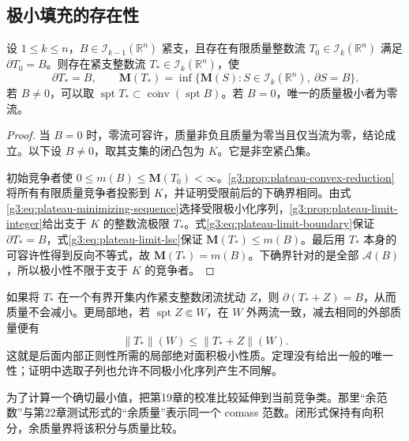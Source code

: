 \subsection{极小填充的存在性}
\label{g3:subsec:2302:04}
\begin{theorem}\label{g3:thm:euclidean-plateau-existence}
	设 \(1\le k\le n\)，\(B\in\mathcal I_{k-1}(\mathbb R^n)\) 紧支，且存在有限质量整数流 \(T_0\in\mathcal I_k(\mathbb R^n)\) 满足 \(\partial T_0=B\)。则存在紧支整数流 \(T_*\in\mathcal I_k(\mathbb R^n)\)，使
	\begin{equation}\label{g3:eq:plateau-global-minimum}
		\partial T_*=B,\qquad
		\mathbf M(T_*)=\inf\{\mathbf M(S):
		S\in\mathcal I_k(\mathbb R^n),\ \partial S=B\}.
	\end{equation}
	若 \(B\ne0\)，可以取 \(\operatorname{spt}T_*\subset
	\overline{\operatorname{conv}}(\operatorname{spt}B)\)。若 \(B=0\)，唯一的质量极小者为零流。
\end{theorem}
\begin{proof}
	当 \(B=0\) 时，零流可容许，质量非负且质量为零当且仅当流为零，结论成立。以下设 \(B\ne0\)，取其支集的闭凸包为 \(K\)。它是非空紧凸集。

	初始竞争者使 \(0\le m(B)\le\mathbf M(T_0)<\infty\)。\cref{g3:prop:plateau-convex-reduction}将所有有限质量竞争者投影到 \(K\)，并证明受限前后的下确界相同。由式\eqref{g3:eq:plateau-minimizing-sequence}选择受限极小化序列，\cref{g3:prop:plateau-limit-integer}给出支于 \(K\) 的整数流极限 \(T_*\)。式\eqref{g3:eq:plateau-limit-boundary}保证 \(\partial T_*=B\)，式\eqref{g3:eq:plateau-limit-lsc}保证 \(\mathbf M(T_*)\le m(B)\)。最后用 \(T_*\) 本身的可容许性得到反向不等式，故 \(\mathbf M(T_*)=m(B)\)。下确界针对的是全部 \(\mathcal A(B)\)，所以极小性不限于支于 \(K\) 的竞争者。
\end{proof}

如果将 \(T_*\) 在一个有界开集内作紧支整数闭流扰动 \(Z\)，则 \(\partial(T_*+Z)=B\)，从而质量不会减小。更局部地，若 \(\operatorname{spt}Z\Subset W\)，在 \(W\) 外两流一致，减去相同的外部质量便有
\[
	\|T_*\|(W)\le\|T_*+Z\|(W).
\]
这就是后面内部正则性所需的局部绝对面积极小性质。定理没有给出一般的唯一性；证明中选取子列也允许不同极小化序列产生不同解。

\ProseParagraphBreak
为了计算一个确切最小值，把第19章的校准比较延伸到当前竞争类。那里“余范数”与第22章测试形式的“余质量”表示同一个 comass 范数。闭形式保持有向积分，余质量界将该积分与质量比较。

